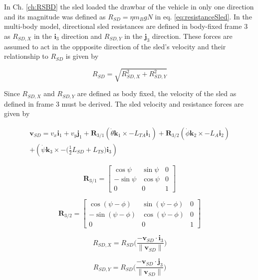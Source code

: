 In Ch. \ref{ch:RSBD} the sled loaded the drawbar of the vehicle in only one direction and its magnitude was defined as $R_{SD} = \eta m_BgN$ in eq. \ref{eq:resistanceSled}. In the multi-body model, directional sled resistances are defined in body-fixed frame 3 as $R_{SD,X}$ in the $\mathbf{i}_3$ direction and $R_{SD,Y}$ in the $\mathbf{j}_3$ direction. These forces are assumed to act in the oppposite direction of the sled's velocity and their relationship to $R_{SD}$ is given by
\begin{linenomath*}
    \begin{equation}
        R_{SD} = \sqrt{R_{SD,X}^2 + R_{SD,Y}^2}
    \end{equation}
\end{linenomath*}
Since $R_{SD,X}$ and $R_{SD,Y}$ are defined as body fixed, the velocity of the sled as defined in frame 3 must be derived. The sled velocity and resistance forces are given by
\begin{linenomath*}
    \begin{multline}
        \mathbf{v}_{SD}  = v_x\mathbf{i}_1 + v_y\mathbf{j}_1 + \mathbf{R}_{3/1}(\dot\theta\mathbf{k}_1 \times -L_{TA}\mathbf{i}_1) + \mathbf{R}_{3/2}(\dot\phi\mathbf{k}_2 \times -L_A\mathbf{i}_2) \\ + (\dot\psi\mathbf{k}_3 \times -\Big(\frac{1}{2}L_{SD} + L_{TS}\Big)\mathbf{i}_3) 
    \end{multline}
\end{linenomath*}
\begin{linenomath*}
    \begin{equation}
        \mathbf{R}_{3/1} = \begin{bmatrix} \cos\psi & \sin\psi & 0 \\ -\sin\psi & \cos\psi & 0 \\ 0 & 0 & 1 \end{bmatrix}
    \end{equation}
\end{linenomath*}
\begin{linenomath*}
    \begin{equation}
        \mathbf{R}_{3/2} = \begin{bmatrix} \cos(\psi-\phi) & \sin(\psi-\phi) & 0 \\ -\sin(\psi-\phi) & \cos(\psi-\phi) & 0 \\ 0 & 0 & 1 \end{bmatrix}
    \end{equation}
\end{linenomath*}
\begin{linenomath*}
    \begin{equation}
        R_{SD,X} = R_{SD}\Big(\frac {-\mathbf{v}_{SD} \cdot \mathbf{i}_3} { \|\mathbf{v}_{SD}\| } \Big)
    \end{equation}
\end{linenomath*}
\begin{linenomath*}
    \begin{equation}
        R_{SD,Y} = R_{SD}\Big(\frac {-\mathbf{v}_{SD} \cdot \mathbf{j}_3} { \|\mathbf{v}_{SD}\| } \Big)
    \end{equation}
\end{linenomath*}

